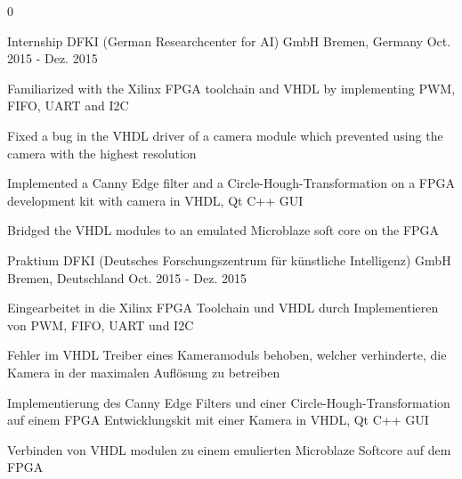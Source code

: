 \begin{cventries}
\multilang
  {0}
  {\cventry
    {Internship} %
    {DFKI (German Researchcenter for AI) GmbH} %
    {Bremen, Germany} %
    {Oct. 2015 - Dez. 2015} %
    {
      \begin{cvitems} %
        \item {Familiarized with the Xilinx FPGA toolchain and VHDL by implementing PWM, FIFO, UART and I2C}
        \item {Fixed a bug in the VHDL driver of a camera module which prevented using the camera with the highest resolution}
        \item {Implemented a Canny Edge filter and a Circle-Hough-Transformation on a FPGA development kit with camera in VHDL, Qt C++ GUI}
        \item {Bridged the VHDL modules to an emulated Microblaze soft core on the FPGA}
      \end{cvitems}
    }
  }{\cventry
    {Praktium} %
    {DFKI (Deutsches Forschungszentrum für künstliche Intelligenz) GmbH} %
    {Bremen, Deutschland} %
    {Oct. 2015 - Dez. 2015} %
    {
      \begin{cvitems} %
        \item {Eingearbeitet in die Xilinx FPGA Toolchain und VHDL durch Implementieren von PWM, FIFO, UART und I2C}
        \item {Fehler im VHDL Treiber eines Kameramoduls behoben, welcher verhinderte, die Kamera in der maximalen Auflösung zu betreiben}
        \item {Implementierung des Canny Edge Filters und einer Circle-Hough-Transformation auf einem FPGA Entwicklungskit mit einer Kamera in VHDL, Qt C++ GUI}
        \item {Verbinden von VHDL modulen zu einem emulierten Microblaze Softcore auf dem FPGA}
      \end{cvitems}
    }
  }


\end{cventries}
